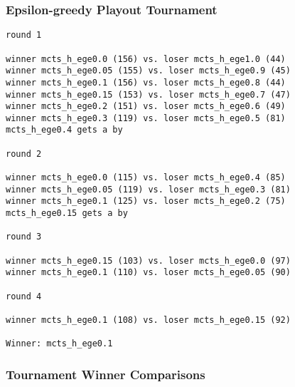 \documentclass{article}
\begin{document}
\subsubsection{Epsilon-greedy Playout Tournament}

\begin{verbatim}
round 1

winner mcts_h_ege0.0 (156) vs. loser mcts_h_ege1.0 (44)
winner mcts_h_ege0.05 (155) vs. loser mcts_h_ege0.9 (45)
winner mcts_h_ege0.1 (156) vs. loser mcts_h_ege0.8 (44)
winner mcts_h_ege0.15 (153) vs. loser mcts_h_ege0.7 (47)
winner mcts_h_ege0.2 (151) vs. loser mcts_h_ege0.6 (49)
winner mcts_h_ege0.3 (119) vs. loser mcts_h_ege0.5 (81)
mcts_h_ege0.4 gets a by

round 2

winner mcts_h_ege0.0 (115) vs. loser mcts_h_ege0.4 (85)
winner mcts_h_ege0.05 (119) vs. loser mcts_h_ege0.3 (81)
winner mcts_h_ege0.1 (125) vs. loser mcts_h_ege0.2 (75)
mcts_h_ege0.15 gets a by

round 3

winner mcts_h_ege0.15 (103) vs. loser mcts_h_ege0.0 (97)
winner mcts_h_ege0.1 (110) vs. loser mcts_h_ege0.05 (90)

round 4

winner mcts_h_ege0.1 (108) vs. loser mcts_h_ege0.15 (92)

Winner: mcts_h_ege0.1
\end{verbatim}

\subsubsection{Tournament Winner Comparisons}

%
\end{document}
